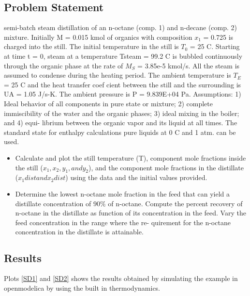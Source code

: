 \documentclass[12pt]{report}
\begin{document}
\subsection{Problem Statement} 
semi-batch steam distillation of an n-octane (comp. 1) and n-decane
(comp. 2) mixture. Initially M = 0.015 kmol of organics with
composition $x_1$ = 0.725 is charged into the still. The initial
temperature in the still is $T_0$ = 25 \degree C. Starting at time t = 0, steam at a temperature Tsteam = 99.2 \degree C is bubbled continuously through the organic phase at the rate of $M_S$ = 3.85e-5 kmol/s. All the steam is assumed to condense during the heating period. The ambient temperature is $T_E$ = 25 \degree C and the heat transfer coef cient between the still and the surrounding is UA = 1.05 J/s-K. The ambient pressure is P = 9.839E+04 Pa.
Assumptions: 1) Ideal behavior of all components in pure state or mixture; 2) complete immiscibility of the water and the organic phases; 3) ideal mixing in the boiler; and 4) equi- librium between the organic vapor and its liquid at all times. The standard state for enthalpy calculations pure liquids at 0 \degree C and 1 atm. can be used.

\begin{itemize}
\item Calculate and plot the still temperature (T), component mole fractions inside the still ($x_1, x_2, y_1, and y_2$), and the component mole fractions in the distillate ($x_1dist and x_2dist$) using the data and the initial values provided.
\item Determine the lowest n-octane mole fraction in the
feed that can yield a distillate concentration of $90\%$ of n-octane. Compute the percent recovery of n-octane in the distillate as function of its concentration in the feed. Vary the feed concentration in the range where the re- quirement for the n-octane concentration in the distillate is attainable.
\end{itemize}

\subsection{Results}
Plots \ref{SD1} and \ref{SD2} shows the results obtained by simulating the example in openmodelica by using the built in thermodynamics. \\
\end{document}
